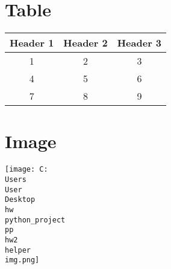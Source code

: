 \documentclass{article}
\begin{document}
\section{Table}
\begin{tabular}{|c|c|c|}
\hline
Header 1 & Header 2 & Header 3 \\
\hline
1 & 2 & 3 \\
\hline
4 & 5 & 6 \\
\hline
7 & 8 & 9 \\
\hline
\end{tabular}

\section{Image}
\texttt{[image: C:\\Users\\User\\Desktop\\hw\\python\_project\\pp\\hw2\\helper\\img.png]}
\end{document}
